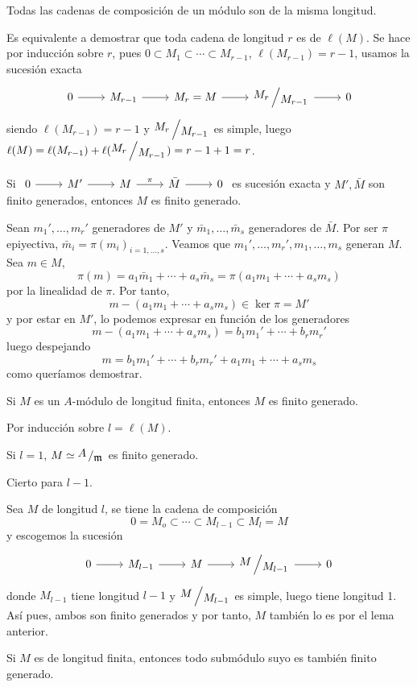 \begin{teo}
    Todas las cadenas de composici\'on de un m\'odulo son de la misma longitud.
\end{teo}\begin{dem}
    Es equivalente a demostrar que toda cadena de longitud $r$ es de $\ell(M)$. Se hace por inducci\'on sobre $r$, pues $0\subset M_1 \subset \cdots \subset M_{r-1}$, $\ell(M_{r-1}) = r-1$, usamos la sucesi\'on exacta 
    $$\bt 0 \rar & M_{r-1} \rar & M_r = M \rar & \modulo{M_r}{M_{r-1}} \rar & 0 \et$$ siendo $\ell(M_{r-1}) = r-1$ y $\modulo{M_r}{M_{r-1}} $ es simple, luego $\ell(M) = \ell(M_{r-1}) + \ell(\modulo{M_r}{M_{r-1}}) = r-1 + 1 = r$. 
\end{dem}




\begin{lem}
    Si $\bt 0\rar &  M ' \rar & M \rar{\pi} & \bar M \rar & 0 \et$ es sucesi\'on exacta y $M', \bar M$ son finito generados, entonces $M$ es finito generado.
\end{lem}
\begin{dem}
    Sean $m_1', \ldots, m_r'$ generadores de $M'$ y $\bar m_1, \ldots, \bar m_s$ generadores de $\bar M$. Por ser $\pi$ epiyectiva, $\bar m_i = \pi (m_i) _ {i=1, \ldots, s}$. Veamos que $m_1', \ldots, m_r ', m_1, \ldots, m_s$ generan $M$. Sea $m \in M$,
    $$\pi(m) = a_1 \bar m_1 + \cdots + a_s \bar m_s = \pi(a_1 m_1 + \cdots + a_s m_s)$$
    por la linealidad de $\pi$. Por tanto, 
    $$m-(a_1m_1 + \cdots + a_sm_s) \in \ker \pi = M ' $$
    y por estar en $M'$, lo podemos expresar en funci\'on de los generadores
    $$m-(a_1m_1 + \cdots + a_sm_s) = b_1m_1' + \cdots + b_r m_r'$$
    luego despejando
    $$m =  b_1m_1' + \cdots + b_r m_r' + a_1m_1 + \cdots + a_sm_s$$
    como quer\'iamos demostrar. 
\end{dem}
\begin{prop}
    Si $M$ es un $A$-m\'odulo de longitud finita, entonces $M$ es finito generado. 
\end{prop}
\begin{dem}
    Por inducci\'on sobre $l = \ell(M)$. 

    Si $l=1$, $M \simeq \modulo{A}{\m}$ es finito generado. 

    Cierto para $l-1$. 

    Sea $M$ de longitud $l$, se tiene la cadena de composici\'on
    $$0=M_o \subset \cdots \subset M_{l-1} \subset M_l = M$$
    y escogemos la sucesi\'on
    $$\bt 0 \rar & M_{l-1} \rar & M \rar & \modulo{M}{M_{l-1}} \rar & 0 \et$$ donde $M_{l-1}$ tiene longitud $l-1$ y $\modulo{M}{M_{l-1}}$ es simple, luego tiene longitud 1. As\'i pues, ambos son finito generados y por tanto, $M$ tambi\'en lo es por el lema anterior.
\end{dem}
\begin{cor}
    Si $M$ es de longitud finita, entonces todo subm\'odulo suyo es tambi\'en finito generado. 
\end{cor}


